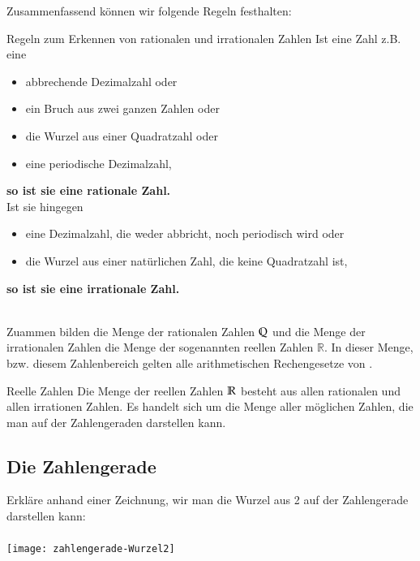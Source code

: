 Zusammenfassend können wir folgende Regeln festhalten:

\begin{law}{Regeln zum Erkennen von rationalen und irrationalen Zahlen}
	Ist eine Zahl z.B. eine
	\begin{itemize}\setlength\itemsep{0pt}
		\item abbrechende Dezimalzahl oder
		\item ein Bruch aus zwei ganzen Zahlen oder
		\item die Wurzel aus einer Quadratzahl oder
		\item eine periodische Dezimalzahl,
	\end{itemize}
	{\bfseries so ist sie eine rationale Zahl.}\\
	Ist sie hingegen
    \begin{itemize}\setlength\itemsep{0pt}
		\item eine Dezimalzahl, die weder abbricht, noch periodisch wird oder
		\item die Wurzel aus einer natürlichen Zahl, die keine Quadratzahl ist,
	\end{itemize}
	{\bfseries so ist sie eine irrationale Zahl.}\\
\end{law}~\\

Zuammen bilden die Menge der rationalen Zahlen $\mathbb{Q}$ und die Menge der irrationalen Zahlen die Menge der sogenannten reellen Zahlen $\mathbb{R}$.
In dieser Menge, bzw. diesem Zahlenbereich gelten alle arithmetischen Rechengesetze von \pageref{law:arithmetic}.\\

\begin{defn}{Reelle Zahlen}
	Die Menge der reellen Zahlen $\mathbb{R}$ besteht aus allen rationalen und allen irrationen Zahlen.
	Es handelt sich um die Menge aller möglichen Zahlen, die man auf der Zahlengeraden darstellen kann.
\end{defn}

\newpage
\subsection{Die Zahlengerade}
Erkläre anhand einer Zeichnung, wir man die Wurzel aus 2 auf der Zahlengerade darstellen kann:\\~\\
 \texttt{[image: zahlengerade-Wurzel2]}\\
\vspace{7cm}



